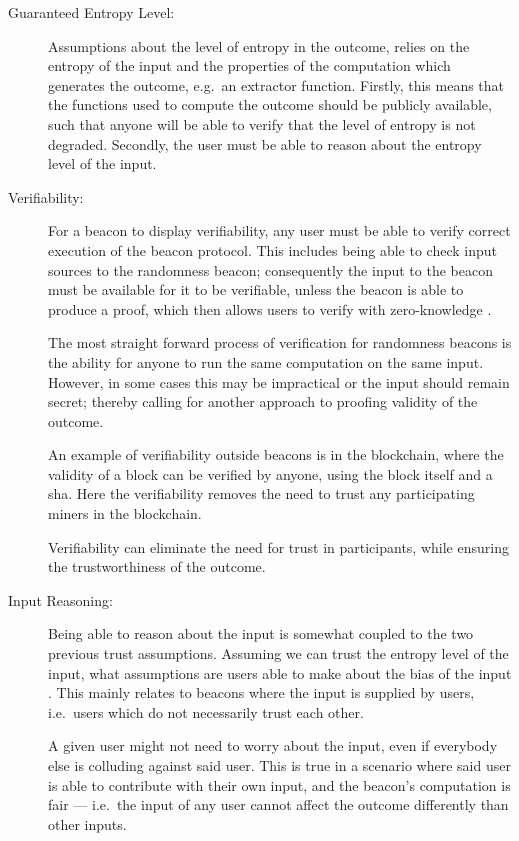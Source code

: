 \begin{description}

    \item [Guaranteed Entropy Level:]
        Assumptions about the level of entropy in the outcome, relies on the entropy of the input and the properties of the computation which generates the outcome, e.g.\ an extractor function.
        Firstly, this means that the functions used to compute the outcome should be publicly available, such that anyone will be able to verify that the level of entropy is not degraded.
        Secondly, the user must be able to reason about the entropy level of the input.

    \item [Verifiability:]
        For a beacon to display verifiability, any user must be able to verify correct execution of the beacon protocol.
        This includes being able to check input sources to the randomness beacon;
        consequently the input to the beacon must be available for it to be verifiable, unless the beacon is able to produce a proof, which then allows users to verify with zero-knowledge .

        The most straight forward process of verification for randomness beacons is the ability for anyone to run the same computation on the same input.
        However, in some cases this may be impractical or the input should remain secret; thereby calling for another approach to proofing  validity of the outcome.

        An example of verifiability outside beacons is in the blockchain, where the validity of a block can be verified by anyone, using the block itself and a \acrfull{sha}.
        Here the verifiability removes the need to trust any participating miners in the blockchain.

        Verifiability can eliminate the need for trust in participants, while ensuring the trustworthiness of the outcome.

    \item [Input Reasoning:]
        Being able to reason about the input is somewhat coupled to the two previous trust assumptions.
        Assuming we can trust the entropy level of the input, what assumptions are users able to make about the bias of the input .
        This mainly relates to beacons where the input is supplied by users, i.e.\ users which do not necessarily trust each other.

        A given user might not need to worry about the input, even if everybody else is colluding against said user.
        This is true in a scenario where said user is able to contribute with their own input, and the beacon's computation is fair
        --- i.e.\ the input of any user cannot affect the outcome differently than other inputs.

\end{description}

